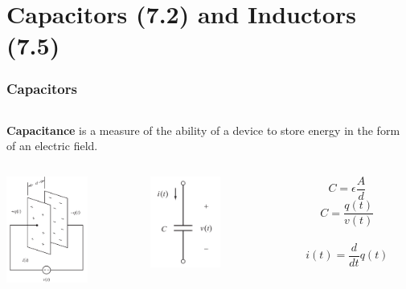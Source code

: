 \documentclass[aspectratio=169]{beamer}
\begin{document}
\section{Capacitors (7.2) and Inductors (7.5)}
\begin{frame}[fragile]
\frametitle{Capacitors}
\begin{columns}
\begin{column}{1\textwidth}  %
\textbf{Capacitance} is a measure of the ability of a device to store energy in the form of an electric field.
\end{column}
\end{columns}

	

	\begin{columns}
		\begin{column}{.2\textwidth}  %
		\begin{center}
			\includegraphics[height=3.5cm]{figura1.png}
		\end{center}
		\end{column}
		\begin{column}{.22\textwidth}  %
		\begin{center}
			\includegraphics[height=3cm]{figura2.png}
		\end{center}
		\end{column}
		\begin{column}{.17\textwidth}  %
		\begin{center}
			\scriptsize	\begin{equation} 
					 {C=\epsilon \frac{A}{d}} 
					\end{equation}
			\scriptsize	\begin{equation} 
					C=\frac{q(t)}{v(t)}
					\end{equation}\\
		    \scriptsize	\begin{equation} 
					i(t)=\frac{d}{dt}q(t)
					\end{equation}			
		\end{center}
		\end{column}


\end{columns}
\end{frame}
\end{document}
